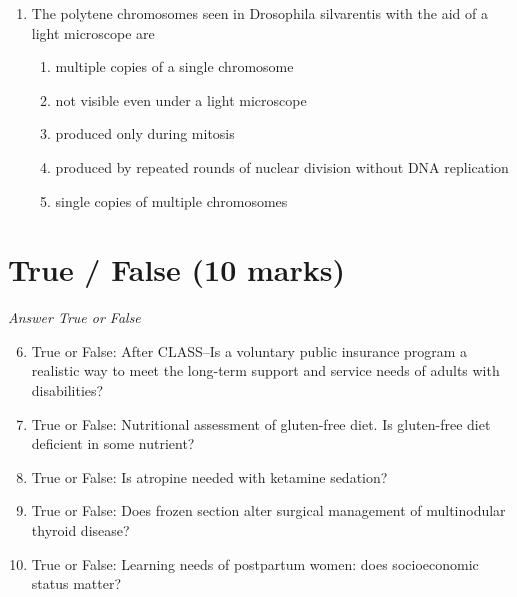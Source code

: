\documentclass[12pt]{article}
\begin{document}
\begin{enumerate}[label=\arabic*.]
\begin{enumerate}[label=(\alph*)]
    \item homeotic genes
    \item cell division
    \item signal transduction
    \item cell differentiation
    \item apoptosis
\end{enumerate}
\item The polytene chromosomes seen in Drosophila silvarentis with the aid of a light microscope are
\begin{enumerate}[label=(\alph*)]
    \item multiple copies of a single chromosome
    \item not visible even under a light microscope
    \item produced only during mitosis
    \item produced by repeated rounds of nuclear division without DNA replication
    \item single copies of multiple chromosomes
\end{enumerate}
\end{enumerate}

\section*{True / False (10 marks)}
\textit{Answer True or False}
\begin{enumerate}[label=\arabic*.]
\setcounter{enumi}{5}
\item True or False: After CLASS--Is a voluntary public insurance program a realistic way to meet the long-term support and service needs of adults with disabilities?
\item True or False: Nutritional assessment of gluten-free diet. Is gluten-free diet deficient in some nutrient?
\item True or False: Is atropine needed with ketamine sedation?
\item True or False: Does frozen section alter surgical management of multinodular thyroid disease?
\item True or False: Learning needs of postpartum women: does socioeconomic status matter?
\end{enumerate}
\end{document}
